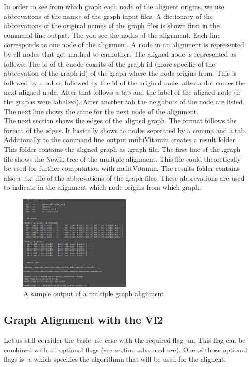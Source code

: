 \documentclass{SeminarV2}
\begin{document}
In order to see from which graph each node of the alignent origins, we use
abbrevations of the names of the graph input files. A dictionary of the abbrevations
of the original names of the graph files is shown first in the command line output.
The you see the nodes of the alignment. Each line corresponds to one node
of the alignment. A node in an alignment is represented by all nodes that got mathed
to eachother. The aligned node is represented as follows:
The id of th enode consits of the graph id (more specific of the abbrevation of the graph id) of the
graph where the node origins from. This is followed by a colon, followed by the id
of the original node. after a dot comes the next aligned node. After that
 follows a tab and the label of the aligned node (if the graphs were labelled).
After another tab the neighbors of the node are listed. The next line shows
the same for the next node of the alignment.\\
The next section shows the edges of the aligned graph. The format follows the format
of the edges. It basically shows to nodes seperated by a comma and a tab. \\
Additionally to the command line output multiVitamin creates a result folder.
This folder contains the aligned graph as .graph file. The first line of the
.graph file shows the Newik tree of the mulitple alignment.
This file could theoretically
be used for further computation with mulitVitamin. The results folder contains
also a .txt file of the abbrevations of the graph files. These abbrevations are
used to indicate in the alignment which node origins from which graph.\\
\begin{figure}
     \includegraphics[width=0.5\textwidth]{multiOUT.png}
  \caption{A sample output of a multiple graph alignment}
\end{figure}


\subsection{Graph Alignment with the Vf2}
Let us still consider the basic use case with the required flag -m. This flag can
be combined with all optional flags (see section advanced use). One of those optional
flags is -a which specifies the algorithmn that will be used for the alignent.
\end{document}
